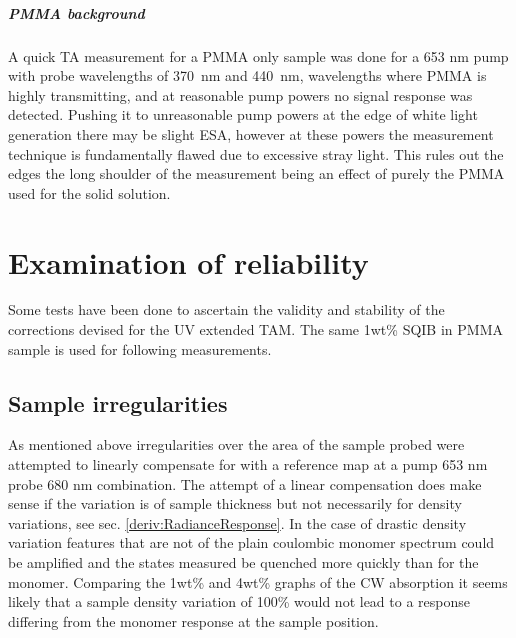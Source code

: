 \documentclass[twoside,openright]{scrreprt}
\begin{document}
\paragraph{PMMA background}
A quick TA measurement for a PMMA only sample was done for a 653 nm pump with probe wavelengths of \SI{370}{\nano\meter} and \SI{440}{\nano\meter},  wavelengths where PMMA is highly transmitting, and at reasonable pump powers no signal response was detected. Pushing it to unreasonable pump powers at the edge of white light generation there may be slight ESA, however at these powers the measurement technique is fundamentally flawed due to excessive stray light. This rules out the edges the long shoulder of the measurement being an effect of purely the PMMA used for the solid solution.




\chapter{Examination of reliability}\label{chpt:reliability}
Some tests have been done to ascertain the validity and stability of the corrections devised for the UV extended TAM. The same 1wt\% SQIB in PMMA sample is used for following measurements.
\section{Sample irregularities}
As mentioned above irregularities over the area of the sample probed were attempted to linearly compensate for with a reference map at a pump 653 nm probe 680 nm combination. The attempt of a linear compensation does make sense if the variation is of sample thickness but not necessarily for density variations, see sec. \ref{deriv:RadianceResponse}. In the case of drastic density variation features that are not of the plain coulombic monomer spectrum could be amplified and the states measured be quenched more quickly than for the monomer. Comparing the 1wt\% and 4wt\% graphs of the CW absorption it seems likely that a sample density variation of 100\% would not lead to a response differing from the monomer response at the sample position.
\end{document}
